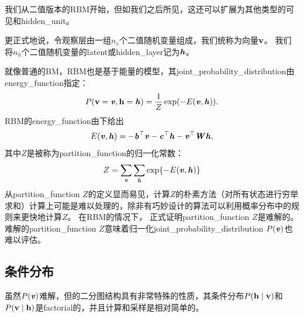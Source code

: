 
我们从二值版本的\gls{RBM}开始，但如我们之后所见，这还可以扩展为其他类型的可见和\gls{hidden_unit}。

更正式地说，令观察层由一组$n_v$个二值随机变量组成，我们统称为向量$\mathbf{v}$。
我们将$n_h$个二值随机变量的\gls{latent}或\gls{hidden_layer}记为$\boldsymbol{\mathit{h}}$。

就像普通的\gls{BM}，\gls{RBM}也是基于能量的模型，其\gls{joint_probability_distribution}由\gls{energy_function}指定：
\begin{align}
 P(\mathbf{v} = \boldsymbol{\mathit{v}}, \mathbf{h} = \boldsymbol{\mathit{h}}) = \frac{1}{Z} \exp(-E(\boldsymbol{\mathit{v}}, \boldsymbol{\mathit{h}})).
\end{align}
RBM的\gls{energy_function}由下给出
\begin{align} \label{eq:205e}
 E(\boldsymbol{\mathit{v}}, \boldsymbol{\mathit{h}}) = -\boldsymbol{\mathit{b}}^\top \boldsymbol{\mathit{v}} - \boldsymbol{\mathit{c}}^\top \boldsymbol{\mathit{h}} - \boldsymbol{\mathit{v}}^\top \boldsymbol{\mathit{W}} \boldsymbol{\mathit{h}},
\end{align}
其中$Z$是被称为\gls{partition_function}的归一化常数：
\begin{align}
 Z = \sum_{\boldsymbol{\mathit{v}}} \sum_{\boldsymbol{\mathit{h}}} \exp \{-E(\boldsymbol{\mathit{v}}, \boldsymbol{\mathit{h}}) \}
\end{align}
从\gls{partition_function} $Z$的定义显而易见，计算$Z$的朴素方法（对所有状态进行穷举求和）计算上可能是难以处理的，除非有巧妙设计的算法可以利用概率分布中的规则来更快地计算$Z$。
在\gls{RBM}的情况下， \citet{long10rbm}正式证明\gls{partition_function} $Z$是难解的。
难解的\gls{partition_function} $Z$意味着归一化\gls{joint_probability_distribution} $P(\boldsymbol{\mathit{v}})$也难以评估。


\subsection{条件分布}
\label{sec:conditional_distributions_chap20}
虽然$P(\boldsymbol{\mathit{v}})$难解，但的二分图结构具有非常特殊的性质，其条件分布$P(\mathbf{h} \mid \mathbf{v})$和$P(\mathbf{v}\mid\mathbf{h})$是\gls{factorial}的，并且计算和采样是相对简单的。



